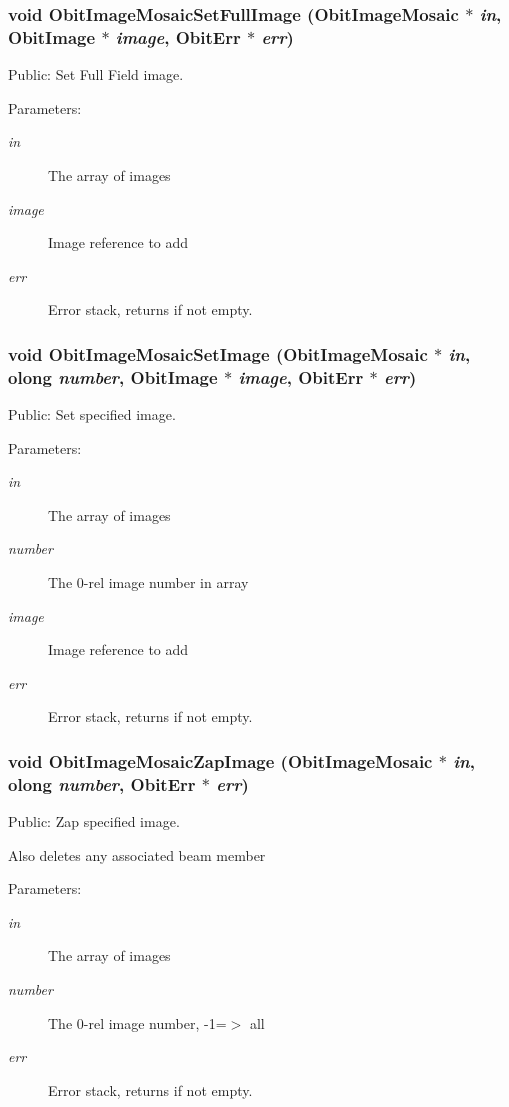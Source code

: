 \subsubsection{\setlength{\rightskip}{0pt plus 5cm}void Obit\-Image\-Mosaic\-Set\-Full\-Image ({\bf Obit\-Image\-Mosaic} $\ast$ {\em in}, {\bf Obit\-Image} $\ast$ {\em image}, {\bf Obit\-Err} $\ast$ {\em err})}\label{ObitImageMosaic_8h_a15}


Public: Set Full Field image. 

\begin{Desc}
\item[Parameters:]
\begin{description}
\item[{\em in}]The array of images \item[{\em image}]Image reference to add \item[{\em err}]Error stack, returns if not empty. \end{description}
\end{Desc}
\subsubsection{\setlength{\rightskip}{0pt plus 5cm}void Obit\-Image\-Mosaic\-Set\-Image ({\bf Obit\-Image\-Mosaic} $\ast$ {\em in}, {\bf olong} {\em number}, {\bf Obit\-Image} $\ast$ {\em image}, {\bf Obit\-Err} $\ast$ {\em err})}\label{ObitImageMosaic_8h_a12}


Public: Set specified image. 

\begin{Desc}
\item[Parameters:]
\begin{description}
\item[{\em in}]The array of images \item[{\em number}]The 0-rel image number in array \item[{\em image}]Image reference to add \item[{\em err}]Error stack, returns if not empty. \end{description}
\end{Desc}
\subsubsection{\setlength{\rightskip}{0pt plus 5cm}void Obit\-Image\-Mosaic\-Zap\-Image ({\bf Obit\-Image\-Mosaic} $\ast$ {\em in}, {\bf olong} {\em number}, {\bf Obit\-Err} $\ast$ {\em err})}\label{ObitImageMosaic_8h_a10}


Public: Zap specified image. 

Also deletes any associated beam member \begin{Desc}
\item[Parameters:]
\begin{description}
\item[{\em in}]The array of images \item[{\em number}]The 0-rel image number, -1=$>$ all \item[{\em err}]Error stack, returns if not empty. \end{description}
\end{Desc}
